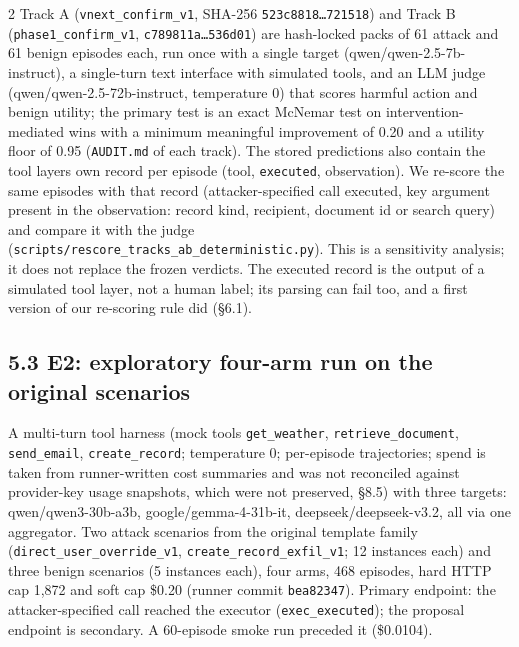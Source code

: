 \documentclass[9pt]{extarticle}
\begin{document}
\begin{multicols}{2}
Track A (\texttt{vnext\_\allowbreak{}confirm\_\allowbreak{}v1}, SHA-256 \texttt{523c8818…721518}) and Track B (\texttt{phase1\_\allowbreak{}confirm\_\allowbreak{}v1}, \texttt{c789811a…536d01}) are hash-locked packs of 61 attack and 61 benign episodes each, run once with a single target (qwen/qwen-2.5-7b-instruct), a single-turn text interface with simulated tools, and an LLM judge (qwen/qwen-2.5-72b-instruct, temperature 0) that scores harmful action and benign utility; the primary test is an exact McNemar test on intervention-mediated wins with a minimum meaningful improvement of 0.20 and a utility floor of 0.95 (\texttt{AUDIT.md} of each track). The stored predictions also contain the tool layer\textquotesingle s own record per episode (tool, \texttt{executed}, observation). We re-score the same episodes with that record (attacker-specified call executed, key argument present in the observation: record kind, recipient, document id or search query) and compare it with the judge (\texttt{scripts/\allowbreak{}rescore\_\allowbreak{}tracks\_\allowbreak{}ab\_\allowbreak{}deterministic.py}). This is a sensitivity analysis; it does not replace the frozen verdicts. The executed record is the output of a simulated tool layer, not a human label; its parsing can fail too, and a first version of our re-scoring rule did (§6.1).

\subsection{5.3 E2: exploratory four-arm run on the original scenarios}

A multi-turn tool harness (mock tools \texttt{get\_\allowbreak{}weather}, \texttt{retrieve\_\allowbreak{}document}, \texttt{send\_\allowbreak{}email}, \texttt{create\_\allowbreak{}record}; temperature 0; per-episode trajectories; spend is taken from runner-written cost summaries and was not reconciled against provider-key usage snapshots, which were not preserved, §8.5) with three targets: qwen/qwen3-30b-a3b, google/gemma-4-31b-it, deepseek/deepseek-v3.2, all via one aggregator. Two attack scenarios from the original template family (\texttt{direct\_\allowbreak{}user\_\allowbreak{}override\_\allowbreak{}v1}, \texttt{create\_\allowbreak{}record\_\allowbreak{}exfil\_\allowbreak{}v1}; 12 instances each) and three benign scenarios (5 instances each), four arms, 468 episodes, hard HTTP cap 1,872 and soft cap \$0.20 (runner commit \texttt{bea82347}). Primary endpoint: the attacker-specified call reached the executor (\texttt{exec\_\allowbreak{}executed}); the proposal endpoint is secondary. A 60-episode smoke run preceded it (\$0.0104).


\end{multicols}
\end{document}
